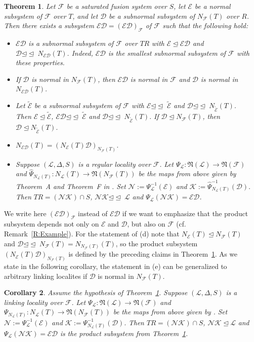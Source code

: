 \documentclass[reqno,11pt]{amsart}
\numberwithin{equation}{section}
\newtheorem{Th}{Theorem}
\newtheorem{corollary}[Th]{Corollary}
\theoremstyle{definition}
\newcommand{\F}{\mathcal{F}}
\newcommand{\E}{\mathcal{E}}
\renewcommand{\L}{\mathcal{L}}
\newcommand{\N}{\mathcal{N}}
\newcommand{\K}{\mathcal{K}}
\newcommand{\fN}{\mathfrak{N}}
\newcommand{\mD}{\mathcal{D}}
\newcommand{\tE}{\widetilde{\E}}
\newcommand{\subn}{{\unlhd\!\unlhd\;}}
\begin{document}
\begin{Th}\label{T:ED}
Let $\F$ be a saturated fusion system over $S$, let $\E$ be a normal subsystem of $\F$ over $T$, and let $\mD$ be a subnormal subsystem of  $N_\F(T)$ over $R$. Then there exists a subsystem $\E\mD=(\E\mD)_\F$ of $\F$ such that the following hold:
\begin{itemize}
 \item [(a)] $\E\mD$ is a subnormal subsystem of $\F$ over $TR$ with $\E\unlhd\E\mD$ and $\mD\subn N_{\E\mD}(T)$. Indeed, $\E\mD$ is the smallest subnormal subsystem of $\F$ with these properties.
 \item [(b)] If $\mD$ is normal in $N_\F(T)$, then $\E\mD$ is normal in $\F$ and $\mD$ is normal in $N_{\E\mD}(T)$.
 \item [(c)] Let $\tE$ be a subnormal subsystem of $\F$ with $\E\subn\tE$ and $\mD\subn N_{\tE}(T)$. Then $\E\unlhd\tE$, $\E\mD\subn\tE$ and $\mD\subn N_{\tE}(T)$. If $\mD\unlhd N_\F(T)$, then $\mD\unlhd N_{\tE}(T)$.
 \item [(d)] $N_{\E\mD}(T)=(N_\E(T)\mD)_{N_\F(T)}$.
 \item [(e)] Suppose $(\L,\Delta,S)$ is a regular locality over $\F$. Let $\Psi_\L\colon\fN(\L)\rightarrow\fN(\F)$ and $\hat{\Psi}_{N_\L(T)}\colon N_\L(T)\rightarrow \fN(N_\F(T))$ be the maps from above given by Theorem~A and Theorem~F in \cite{Chermak/Henke}. Set $\N:=\Psi_\L^{-1}(\E)$ and $\K:=\hat{\Psi}_{N_\L(T)}^{-1}(\mD)$. Then $TR=(\N\K)\cap S$, $\N\K\subn\L$ and $\Psi_\L(\N\K)=\E\mD$.
\end{itemize}
\end{Th}

We write here $(\E\mD)_\F$ instead of $\E\mD$ if we want to emphasize that the product subsystem depends not only on $\E$ and $\mD$, but also on $\F$ (cf. Remark~\ref{R:Example}). For the statement of (d) note that $N_\E(T)\unlhd N_\F(T)$ and $\mD\subn N_\F(T)=N_{N_\F(T)}(T)$, so the product subsystem $(N_\E(T)\mD)_{N_\F(T)}$ is defined by the preceding claims in Theorem~\ref{T:ED}. As we state in the following corollary, the statement in (e) can be generalized to arbitrary linking localites if $\mD$ is normal in $N_\F(T)$.

\begin{corollary}\label{C:EDNormalLocalities}
Assume the hypothesis of Theorem~\ref{T:ED}.
Suppose $(\L,\Delta,S)$ is a linking locality over $\F$. Let $\Psi_\L\colon\fN(\L)\rightarrow\fN(\F)$ and $\Psi_{N_\L(T)}\colon N_\L(T)\rightarrow \fN(N_\F(T))$ be the maps from above given by \cite[Theorem~A]{Chermak/Henke}. Set $\N:=\Psi_\L^{-1}(\E)$ and $\K:=\Psi_{N_\L(T)}^{-1}(\mD)$. Then $TR=(\N\K)\cap S$, $\N\K\unlhd\L$ and $\Psi_\L(\N\K)=\E\mD$ is the product subsystem from Theorem~\ref{T:ED}.
\end{corollary}
\end{document}

